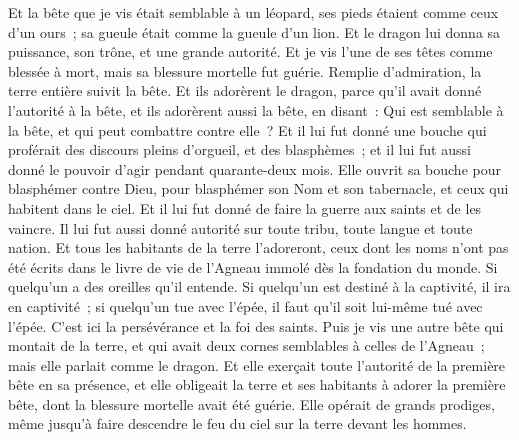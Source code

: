 \begin{multicols}{2}
Et la bête que je vis était semblable à un léopard, ses pieds étaient comme ceux d'un ours~; sa gueule était comme la gueule d'un lion. Et le dragon lui donna sa puissance, son trône, et une grande autorité.
Et je vis l'une de ses têtes comme blessée à mort, mais sa blessure mortelle fut guérie. Remplie d'admiration, la terre entière suivit la bête.
Et ils adorèrent le dragon, parce qu'il avait donné l'autorité à la bête, et ils adorèrent aussi la bête, en disant~: Qui est semblable à la bête, et qui peut combattre contre elle~?
Et il lui fut donné une bouche qui proférait des discours pleins d'orgueil, et des blasphèmes~; et il lui fut aussi donné le pouvoir d'agir pendant quarante-deux mois.
Elle ouvrit sa bouche pour blasphémer contre Dieu, pour blasphémer son Nom et son tabernacle, et ceux qui habitent dans le ciel.
Et il lui fut donné de faire la guerre aux saints et de les vaincre. Il lui fut aussi donné autorité sur toute tribu, toute langue et toute nation.
Et tous les habitants de la terre l'adoreront, ceux dont les noms n'ont pas été écrits dans le livre de vie de l'Agneau immolé dès la fondation du monde.
Si quelqu'un a des oreilles qu'il entende.
Si quelqu'un est destiné à la captivité, il ira en captivité~; si quelqu'un tue avec l'épée, il faut qu'il soit lui-même tué avec l'épée. C'est ici la persévérance et la foi des saints.
Puis je vis une autre bête qui montait de la terre, et qui avait deux cornes semblables à celles de l'Agneau~; mais elle parlait comme le dragon.
Et elle exerçait toute l'autorité de la première bête en sa présence, et elle obligeait la terre et ses habitants à adorer la première bête, dont la blessure mortelle avait été guérie.
Elle opérait de grands prodiges, même jusqu'à faire descendre le feu du ciel sur la terre devant les hommes.

\end{multicols}
